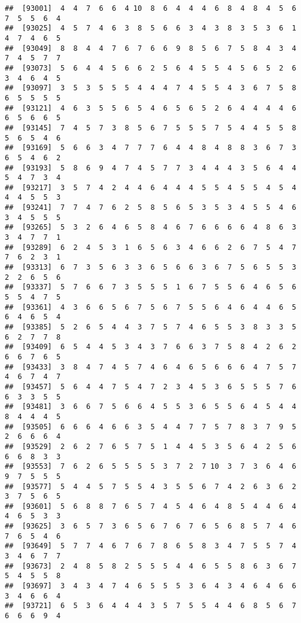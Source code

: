 \documentclass[
]{book}
\begin{document}
\begin{verbatim}
##  [93001]  4  4  7  6  6  4 10  8  6  4  4  4  6  8  4  8  4  5  6  7  5  5  6  4
##  [93025]  4  5  7  4  6  3  8  5  6  6  3  4  3  8  3  5  3  6  1  4  7  4  6  5
##  [93049]  8  8  4  4  7  6  7  6  6  9  8  5  6  7  5  8  4  3  4  7  4  5  7  7
##  [93073]  5  6  4  4  5  6  6  2  5  6  4  5  5  4  5  6  5  2  6  3  4  6  4  5
##  [93097]  3  5  3  5  5  5  4  4  4  7  4  5  5  4  3  6  7  5  8  6  5  5  5  5
##  [93121]  4  6  3  5  5  6  5  4  6  5  6  5  2  6  4  4  4  4  6  6  5  6  6  5
##  [93145]  7  4  5  7  3  8  5  6  7  5  5  5  7  5  4  4  5  5  8  5  6  5  4  6
##  [93169]  5  6  6  3  4  7  7  7  6  4  4  8  4  8  8  3  6  7  3  6  5  4  6  2
##  [93193]  5  8  6  9  4  7  4  5  7  7  3  4  4  4  3  5  6  4  4  5  4  7  3  4
##  [93217]  3  5  7  4  2  4  4  6  4  4  4  5  5  4  5  5  4  5  4  4  4  5  5  3
##  [93241]  7  7  4  7  6  2  5  8  5  6  5  3  5  3  4  5  5  4  6  3  4  5  5  5
##  [93265]  5  3  2  6  4  6  5  8  4  6  7  6  6  6  6  4  8  6  3  3  4  7  7  1
##  [93289]  6  2  4  5  3  1  6  5  6  3  4  6  6  2  6  7  5  4  7  7  6  2  3  1
##  [93313]  6  7  3  5  6  3  3  6  5  6  6  3  6  7  5  6  5  5  3  2  2  6  5  6
##  [93337]  5  7  6  6  7  3  5  5  5  1  6  7  5  5  6  4  6  5  6  5  5  4  7  5
##  [93361]  4  3  6  6  5  6  7  5  6  7  5  5  6  4  6  4  4  6  5  6  4  6  5  4
##  [93385]  5  2  6  5  4  4  3  7  5  7  4  6  5  5  3  8  3  3  5  6  2  7  7  8
##  [93409]  6  5  4  4  5  3  4  3  7  6  6  3  7  5  8  4  2  6  2  6  6  7  6  5
##  [93433]  3  8  4  7  4  5  7  4  6  4  6  5  6  6  6  4  7  5  7  4  6  7  4  7
##  [93457]  5  6  4  4  7  5  4  7  2  3  4  5  3  6  5  5  5  7  6  6  3  3  5  5
##  [93481]  3  6  6  7  5  6  6  4  5  5  3  6  5  5  6  4  5  4  4  8  4  4  4  5
##  [93505]  6  6  6  4  6  6  3  5  4  4  7  7  5  7  8  3  7  9  5  2  6  6  6  4
##  [93529]  2  6  2  7  6  5  7  5  1  4  4  5  3  5  6  4  2  5  6  6  6  8  3  3
##  [93553]  7  6  2  6  5  5  5  5  3  7  2  7 10  3  7  3  6  4  6  9  7  5  5  5
##  [93577]  5  4  4  5  7  5  5  4  3  5  5  6  7  4  2  6  3  6  2  3  7  5  6  5
##  [93601]  5  6  8  8  7  6  5  7  4  5  4  6  4  8  5  4  4  6  4  4  6  5  3  3
##  [93625]  3  6  5  7  3  6  5  6  7  6  7  6  5  6  8  5  7  4  6  7  6  5  4  6
##  [93649]  5  7  7  4  6  7  6  7  8  6  5  8  3  4  7  5  5  7  4  3  4  6  7  7
##  [93673]  2  4  8  5  8  2  5  5  5  4  4  6  5  5  8  6  3  6  7  5  4  5  5  8
##  [93697]  3  4  3  4  7  4  6  5  5  5  3  6  4  3  4  6  4  6  6  3  4  6  6  4
##  [93721]  6  5  3  6  4  4  4  3  5  7  5  5  4  4  6  8  5  6  7  6  6  6  9  4

\end{verbatim}
\end{document}
